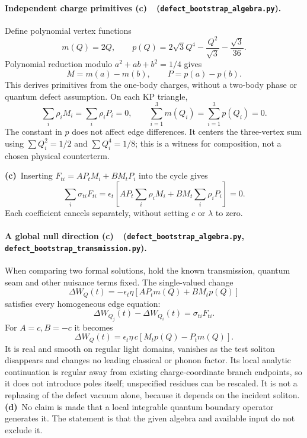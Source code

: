 \documentclass[11pt,a4paper]{article}
\newcommand{\C}{\textbf{(c)}\ }
\newcommand{\D}{\textbf{(d)}\ }
\newcommand{\file}[1]{\nolinkurl{#1}}
\newcommand{\alg}{\file{defect_bootstrap_algebra.py}}
\newcommand{\tra}{\file{defect_bootstrap_transmission.py}}
\begin{document}
\paragraph{Independent charge primitives \C\ (\alg).}
Define polynomial vertex functions
\begin{equation}
 m(Q)=2Q,\qquad p(Q)=2\sqrt3Q^4-\frac{Q^2}{\sqrt3}-\frac{\sqrt3}{36}.
 \label{potentials}
\end{equation}
Polynomial reduction modulo $a^2+ab+b^2=1/4$ gives
\begin{equation}
 M=m(a)-m(b),\qquad P=p(a)-p(b).\label{edgecharges}
\end{equation}
This derives primitives from the one-body charges, without a two-body phase
or quantum defect assumption. On each KP triangle,
\begin{equation}
 \sum_i\rho_iM_i=\sum_i\rho_iP_i=0,\qquad
 \sum_{i=1}^3m(Q_i)=\sum_{i=1}^3p(Q_i)=0.\label{sums}
\end{equation}
The constant in $p$ does not affect edge differences. It centers the
three-vertex sum using $\sum Q_i^2=1/2$ and $\sum Q_i^4=1/8$; this is a
witness for composition, not a chosen physical counterterm.

\C Inserting $F_{ti}=A P_tM_i+B M_tP_i$ into the cycle gives
\begin{equation}
 \sum_i\sigma_{ti}F_{ti}=\epsilon_t\left[
 A P_t\sum_i\rho_iM_i+B M_t\sum_i\rho_iP_i\right]=0.\label{Fcycle}
\end{equation}
Each coefficient cancels separately, without setting $c$ or $\lambda$ to zero.

\paragraph{A global null direction \C\ (\alg, \tra).}
When comparing two formal solutions, hold the known transmission, quantum
seam and other nuisance terms fixed. The single-valued change
\begin{equation}
 \Delta W_Q(t)=-\epsilon_t\eta[A P_t m(Q)+B M_t p(Q)]\label{lift}
\end{equation}
satisfies every homogeneous edge equation:
\begin{equation}
 \Delta W_{Q_j}(t)-\Delta W_{Q_i}(t)=\sigma_{ti}F_{ti}.\label{liftedge}
\end{equation}
For $A=c,B=-c$ it becomes
\begin{equation}
 \boxed{\Delta W_Q(t)=\epsilon_t\eta\,c[M_t p(Q)-P_t m(Q)].}\label{liftc}
\end{equation}
It is real and smooth on regular light domains, vanishes as the test soliton
disappears and changes no leading classical or phonon factor. Its local
analytic continuation is regular away from existing charge-coordinate branch
endpoints, so it does not introduce poles itself; unspecified residues can
be rescaled. It is not a rephasing of the defect vacuum alone, because it
depends on the incident soliton. \D No claim is made that a local integrable
quantum boundary operator generates it. The statement is that the given
algebra and available input do not exclude it.
\end{document}
